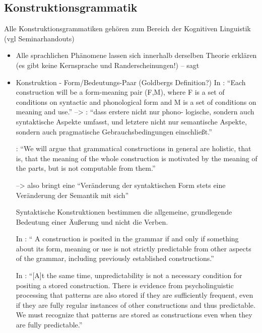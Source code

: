 


\subsection{Konstruktionsgrammatik}
Alle Konstruktionsgrammatiken gehören zum Bereich der Kognitiven Linguistik (vgl Seminarhandouts)

\begin{itemize}
    \item Alle sprachlichen Phänomene lassen sich innerhalb derselben Theorie erklären (es gibt keine Kernsprache und Randerscheinungen!) -- sagt \cite{Tomasello06}
\item Konstruktion - Form/Bedeutungs-Paar (Goldbergs Definition?)
    In \cite{Lakoff87}: ``Each construction will be a form-meaning pair (F,M), where F is a set of conditions on syntactic
    and phonological form and M is a set of conditions on meaning and use.'' --> \cite{Ziem13}: ``dass erstere nicht nur phono-
    logische, sondern auch syntaktische Aspekte umfasst, und letztere nicht nur semantische
    Aspekte, sondern auch pragmatische Gebrauchsbedingungen einschließt.''

    \cite{Lakoff87}: ``We will argue that grammatical constructions in general are holistic, that is, that the
    meaning of the whole construction is motivated by the meaning of the parts, but is not computable
    from them.''

     --> also bringt eine ``Veränderung der syntaktischen Form stets eine Veränderung der Semantik mit sich''

    Syntaktische Konstruktionen bestimmen die allgemeine, grundlegende Bedeutung einer Äußerung und nicht die Verben.

    In \cite{Goldberg95}: `` A construction is posited in the grammar if and only if something about its form, meaning or use is not strictly predictable from other aspects of the grammar, including previously established constructions.''

    In \cite{Goldberg06}: ``[A]t the same time, unpredictability is not a necessary condition for positing a stored construction.
    There is evidence from psycholinguistic processing that patterns are also stored if they are sufficiently frequent, even if they are fully regular instances of other constructions and thus predictable.
    We must recognize that patterns are stored as constructions even when they are fully predictable.''


\end{itemize}

